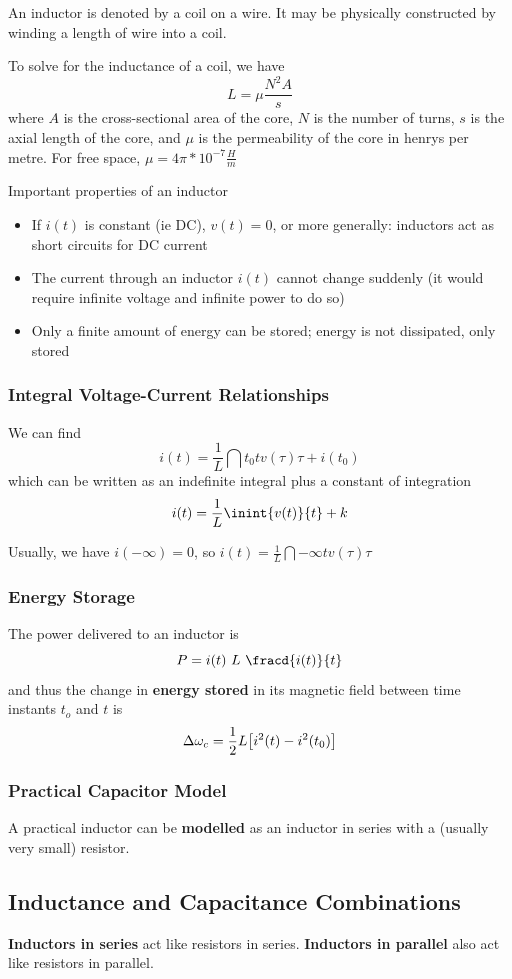 \documentclass[12pt]{article}
\begin{document}
An inductor is denoted by a coil on a wire. It may be physically constructed by winding a length of wire into a coil.

To solve for the inductance of a coil, we have \[ L = \mu \frac{N^2 A}{s} \] where $A$ is the cross-sectional area of the core, $N$ is the number of turns, $s$ is the axial length of the core, and $\mu$ is the permeability of the core in henrys per metre. For free space, $\mu = 4\pi * 10^{-7} \frac{H}{m}$

Important properties of an inductor
\begin{itemize}
\item If $i(t)$ is constant (ie DC), $v(t) = 0$, or more generally: inductors act as short circuits for DC current
\item The current through an inductor $i(t)$ cannot change suddenly (it would require infinite voltage and infinite power to do so)
\item Only a finite amount of energy can be stored; energy is not dissipated, only stored
\end{itemize}

\subsubsection*{Integral Voltage-Current Relationships}
We can find \[ i(t) = \frac{1}{L} \dint{t_0}{t}{v(\tau)}{\tau} + i(t_0) \] which can be written as an indefinite integral plus a constant of integration \[ i(t) = \frac{1}{L} \inint{v(t)}{t} + k \]

Usually, we have $i(-\infty) = 0$, so $i(t) = \frac{1}{L} \dint{-\infty}{t}{v(\tau)}{\tau}$

\subsubsection*{Energy Storage}
The power delivered to an inductor is \[ P = i(t)\ L\ \fracd{i(t)}{t} \] and thus the change in {\bf energy stored} in its magnetic field between time instants $t_o$ and $t$ is \[ \Delta\omega_c = \frac{1}{2} L\bigl[i^2(t) - i^2(t_0)\bigl] \]

\subsubsection*{Practical Capacitor Model}
A practical inductor can be {\bf modelled} as an inductor in series with a (usually very small) resistor.

\subsection*{Inductance and Capacitance Combinations}
{\bf Inductors in series} act like resistors in series. {\bf Inductors in parallel} also act like resistors in parallel.
\end{document}
